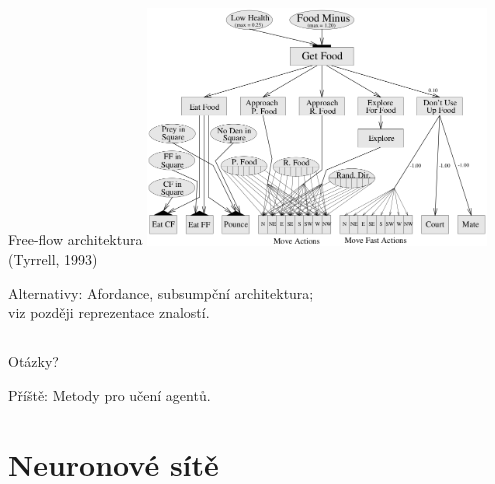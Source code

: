 \documentclass{beamer}
\begin{document}
\subsection{}
\begin{frame}{Free-flow architektura}
\includegraphics[width=9cm]{freeflow.png}
\hfill {\tiny (Tyrrell, 1993)}

Alternativy: Afordance, subsumpční architektura; \\
viz později reprezentace znalostí.
\end{frame}

\subsection{}
\begin{frame}{Otázky?}
\begin{center}
Příště: Metody pro učení agentů.
\end{center}
\end{frame}

\section{Neuronové sítě}
\end{document}
